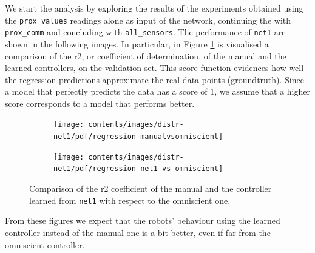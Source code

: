 We start the analysis by exploring the results of the experiments obtained 
using the \texttt{prox\_values} readings alone as input of the network, continuing 
the with \texttt{prox\_comm} and concluding with \texttt{all\_sensors}.
The performance of \texttt{net1} are shown in the following images. In particular,  
in Figure \ref{fig:net1r2} is visualised a comparison of the \gls{r2}, or coefficient 
of determination, of the manual and the learned controllers, on the validation set.
This score function evidences how well the regression predictions approximate 
the real data points (groundtruth). Since a model that perfectly predicts the data 
has a score of $1$, we assume that a higher score corresponds to a model that 
performs better.
\begin{figure}[!htb]
	\centering
	\begin{subfigure}[h]{0.49\textwidth}
		\centering
		\texttt{[image: contents/images/distr-net1/pdf/regression-manualvsomniscient]}%
	\end{subfigure}
	\hfill
	\begin{subfigure}[h]{0.49\textwidth}
		\centering
		\texttt{[image: contents/images/distr-net1/pdf/regression-net1-vs-omniscient]}
	\end{subfigure}
	\caption[Evaluation of the \gls{r2} coefficient of \texttt{net1} .]{Comparison of 
	the \gls{r2} coefficient of the manual and the controller learned from 
	\texttt{net1} with respect to the omniscient one.}
	\label{fig:net1r2}
\end{figure}
From these figures we expect that the robots' behaviour using the learned 
controller instead of the manual one is a bit better, even if far from the omniscient 
controller.

